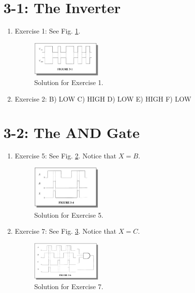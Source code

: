 \documentclass[10pt]{article}
\begin{document}
\maketitle

\section{3-1: The Inverter}

\begin{enumerate}
\item Exercise 1: See Fig. \ref{fig:inv1}.
\begin{figure}[ht]
\centering
\includegraphics[width=0.33\textwidth]{figures/inv1.png}
\caption{\label{fig:inv1} Solution for Exercise 1.}
\end{figure}
\item Exercise 2: B) LOW C) HIGH D) LOW E) HIGH F) LOW
\end{enumerate}

\section{3-2: The AND Gate}

\begin{enumerate}
\item Exercise 5: See Fig. \ref{fig:and1}.  Notice that $X = B$.
\begin{figure}[ht]
\centering
\includegraphics[width=0.33\textwidth]{figures/and1.png}
\caption{\label{fig:and1} Solution for Exercise 5.}
\end{figure}
\item Exercise 7: See Fig. \ref{fig:and2}.  Notice that $X = C$.
\begin{figure}[hb]
\centering
\includegraphics[width=0.33\textwidth]{figures/and2.png}
\caption{\label{fig:and2} Solution for Exercise 7.}
\end{figure}
\end{enumerate}
\end{document}
